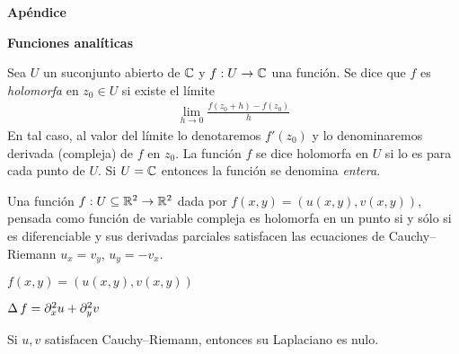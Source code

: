 
\newpage
{\huge \textbf{Apéndice}}



\textbf{Funciones analíticas}
\begin{definition}
  Sea \(U\) un suconjunto abierto de \(\mathbb{C}\) y \(f : U \rightarrow \mathbb{C}\) una función.
  Se dice que \(f\) es \emph{holomorfa} en \(z_0 \in U\) si existe el límite
  \begin{align}
    \lim_{h \rightarrow 0} \frac{f(z_0 + h) - f(z_0)}{h}
  \end{align}
  En tal caso, al valor del límite lo denotaremos \(f'(z_0)\) y lo denominaremos derivada (compleja) de \(f\) en \(z_0\).
  La función \(f\) se dice holomorfa en \(U\) si lo es para cada punto de \(U\).
  Si \(U = \mathbb{C}\) entonces la función se denomina \emph{entera}.
\end{definition}

\begin{theorem}
  Una función \(f : U \subseteq \mathbb{R}^2 \rightarrow \mathbb{R}^2\) dada por  \(f(x, y) = (u(x, y), v(x, y))\), pensada como función de variable compleja es holomorfa en un punto si y sólo si es diferenciable y sus derivadas parciales satisfacen las ecuaciones de Cauchy--Riemann \(u_x = v_y\), \(u_y = - v_x\).
\end{theorem}


\begin{definition}
  \(f(x, y) = (u(x, y), v(x, y))\)

  \(\operatorname{\Delta} f = \partial_x^2 u + \partial_y^2 v\)
\end{definition}

\begin{theorem}
  Si \(u, v\) satisfacen Cauchy--Riemann, entonces su Laplaciano es nulo.
\end{theorem}



